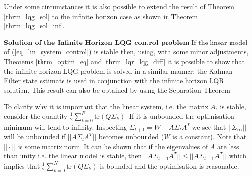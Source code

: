 Under some circumstances it is also possible to extend the result of Theorem \ref{thrm_lqg_sol} to the infinite horizon case as shown in Theorem \ref{thrm_lqg_sol_inf}.
\begin{thrm}
\textbf{Solution of the Infinite Horizon LQG control problem} If the linear model of (\ref{eq_lin_system_control}) is stable then, using, with some minor adjustments, Theorems \ref{thrm_optim_eq} and \ref{thrm_lqr_lqg_diff} it is possible to show that the infinite horizon LQG problem is solved in a similar manner: the Kalman Filter state estimate is used in conjunction with the infinite horizon LQR solution. This result can also be obtained by using the Separation Theorem. \label{thrm_lqg_sol_inf}
\end{thrm}
To clarify why it is important that the linear system, i.e. the matrix $A$, is stable, consider the quantity $\frac{1}{2}\sum_{k=0}^N \text{tr}(Q\Sigma_k)$. If it is unbounded the optimisation minimum will tend to infinity. Inspecting $\Sigma_{t+1} = W+A\Sigma_t A^T$ we see that $||\Sigma_{\infty}||$ will be unbounded if $||A\Sigma_t A^T||$ becomes unbounded ($W$ is a constant). Note that $||\cdot||$ is some matrix norm. It can be shown that if the eigenvalues of $A$ are less than unity i.e. the linear model is stable, then $||A\Sigma_{t+1}A^T|| \leq ||A\Sigma_{t+1}A^T||$ which implies that $\frac{1}{2}\sum_{k=0}^N \text{tr}(Q\Sigma_k)$ is bounded and the optimisation is reasonable.


